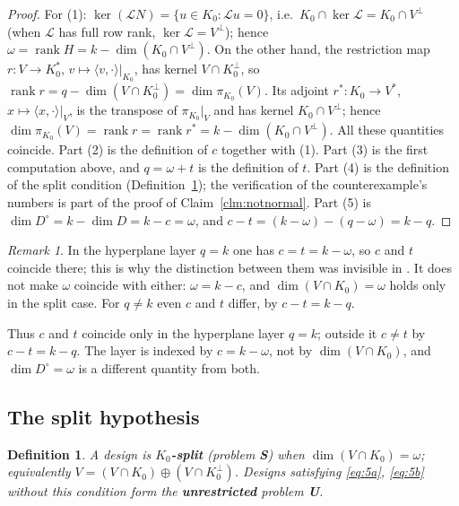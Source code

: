 \documentclass[journal]{IEEEtran}
\theoremstyle{plainn}
\newtheorem{defn}{Definition}
\theoremstyle{remark}
\newtheorem{remark}{Remark}
\newcommand{\rank}{\operatorname{rank}}
\begin{document}
\begin{proof}
For (1): $\ker(\mathcal L N)=\{u\in K_0:\mathcal L u=0\}$, i.e.\
$K_0\cap\ker\mathcal L=K_0\cap V^\perp$ (when $\mathcal L$ has full row rank, $\ker\mathcal L=V^\perp$);
hence $\omega=\rank H=k-\dim(K_0\cap V^\perp)$. On the other hand, the restriction map
$r:V\to K_0^*$, $v\mapsto\langle v,\cdot\rangle|_{K_0}$, has kernel $V\cap K_0^\perp$, so
$\rank r=q-\dim(V\cap K_0^\perp)=\dim\pi_{K_0}(V)$. Its adjoint $r^*:K_0\to V^*$,
$x\mapsto\langle x,\cdot\rangle|_V$, is the transpose of $\pi_{K_0}|_V$ and has kernel $K_0\cap V^\perp$;
hence $\dim\pi_{K_0}(V)=\rank r=\rank r^*=k-\dim(K_0\cap V^\perp)$. All these
quantities coincide. Part (2) is the definition of $c$ together with (1). Part (3) is the first
computation above, and $q=\omega+t$ is the definition of $t$. Part (4) is the definition of the split
condition (Definition~\ref{defn:split}); the verification of the counterexample's numbers is part of the
proof of Claim~\ref{clm:notnormal}. Part (5) is $\dim D^\circ=k-\dim D=k-c=\omega$, and
$c-t=(k-\omega)-(q-\omega)=k-q$.
\end{proof}

\begin{remark}\label{rem:hyp}
In the hyperplane layer $q=k$ one has $c=t=k-\omega$, so $c$ and $t$ coincide there; this is why the
distinction between them was invisible in \cite{companion3}. It does not make $\omega$ coincide with
either: $\omega=k-c$, and $\dim(V\cap K_0)=\omega$ holds only in the split case. For $q\ne k$ even $c$
and $t$ differ, by $c-t=k-q$.
\end{remark}

Thus $c$ and $t$ coincide only in the hyperplane layer $q=k$; outside it $c\ne t$ by $c-t=k-q$. The layer
is indexed by $c=k-\omega$, not by $\dim(V\cap K_0)$, and $\dim D^\circ=\omega$ is a different quantity
from both.

\subsection{The split hypothesis}\label{sec:layers:b}

\begin{defn}\label{defn:split}
A design is \textbf{$K_0$-split} (problem \textbf{S}) when $\dim(V\cap K_0)=\omega$; equivalently
$V=(V\cap K_0)\oplus(V\cap K_0^\perp)$. Designs satisfying \eqref{eq:5a}, \eqref{eq:5b} without this
condition form the \textbf{unrestricted} problem \textbf{U}.
\end{defn}
\end{document}
